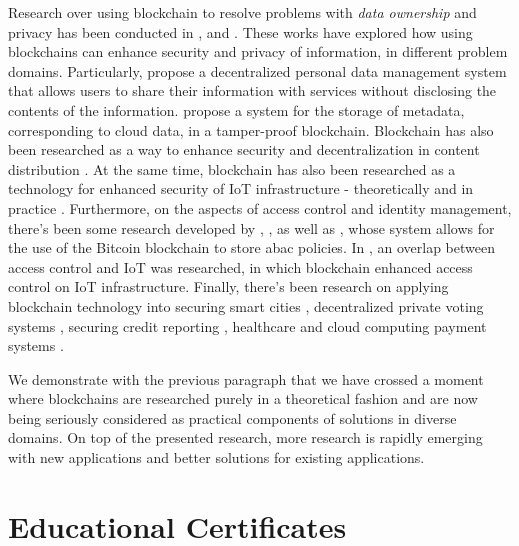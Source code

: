 Research over using blockchain to resolve problems with \textit{data ownership} and privacy has been conducted in \cite{zyskind_decentralizing_2015}, \cite{liang_provchain:_2017} and \cite{yue_healthcare_2016}. These works have explored how using blockchains can enhance security and privacy of information, in different problem domains. Particularly, \citeauthor{zyskind_decentralizing_2015} \cite{zyskind_decentralizing_2015} propose a decentralized personal data management system that allows users to share their information with services without disclosing the contents of the information. \citeauthor{liang_provchain:_2017} \cite{liang_provchain:_2017} propose a system for the storage of metadata, corresponding to cloud data, in a tamper-proof blockchain. Blockchain has also been researched as a way to enhance security and decentralization in content distribution \cite{fotiou_decentralized_2016}. At the same time, blockchain has also been researched as a technology for enhanced security of IoT infrastructure - theoretically \cite{christidis_blockchains_2016, ouaddah_access_2017} and in practice \cite{dorri_blockchain_2017, ouaddah_fairaccess:_2017}. Furthermore, on the aspects of access control and identity management, there's been some research developed by \citeauthor{augot_identity_2017} \cite{augot_identity_2017}, \citeauthor{yasin_online_2016} \cite{yasin_online_2016}, as well as \citeauthor{maesa_blockchain_2017} \cite{maesa_blockchain_2017}, whose system allows for the use of the Bitcoin blockchain to store \gls{abac} policies. In \cite{ouaddah_fairaccess:_2017}, an overlap between access control and IoT was researched, in which blockchain enhanced access control on IoT infrastructure. Finally, there's been research on applying blockchain technology into securing smart cities \cite{biswas_securing_2016}, decentralized private voting systems \cite{sheer_hardwick_e-voting_2018}, securing credit reporting \cite{kafshdar_goharshady_secure_2018}, healthcare \cite{azaria_medrec:_2016} and cloud computing payment systems \cite{zhang_blockchain_2018}.

We demonstrate with the previous paragraph that we have crossed a moment where blockchains are researched purely in a theoretical fashion and are now being seriously considered as practical components of solutions in diverse domains. On top of the presented research, more research is rapidly emerging with new applications and better solutions for existing applications.

\section{Educational Certificates}
\label{sec:related-ec}


